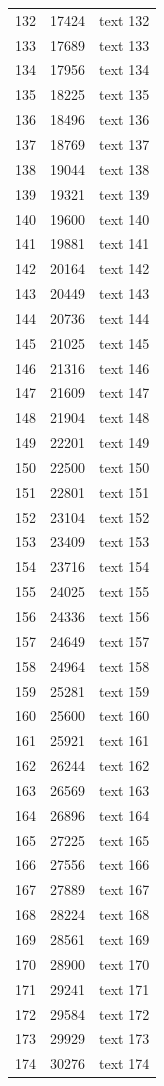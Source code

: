 \documentclass[10pt]{article}
\begin{document}
\begin{longtable}{rrl}
132&17424&text 132\\
133&17689&text 133\\
134&17956&text 134\\
135&18225&text 135\\
136&18496&text 136\\
137&18769&text 137\\
138&19044&text 138\\
139&19321&text 139\\
140&19600&text 140\\
141&19881&text 141\\
142&20164&text 142\\
143&20449&text 143\\
144&20736&text 144\\
145&21025&text 145\\
146&21316&text 146\\
147&21609&text 147\\
148&21904&text 148\\
149&22201&text 149\\
150&22500&text 150\\
151&22801&text 151\\
152&23104&text 152\\
153&23409&text 153\\
154&23716&text 154\\
155&24025&text 155\\
156&24336&text 156\\
157&24649&text 157\\
158&24964&text 158\\
159&25281&text 159\\
160&25600&text 160\\
161&25921&text 161\\
162&26244&text 162\\
163&26569&text 163\\
164&26896&text 164\\
165&27225&text 165\\
166&27556&text 166\\
167&27889&text 167\\
168&28224&text 168\\
169&28561&text 169\\
170&28900&text 170\\
171&29241&text 171\\
172&29584&text 172\\
173&29929&text 173\\
174&30276&text 174\\

\end{longtable}
\end{document}
